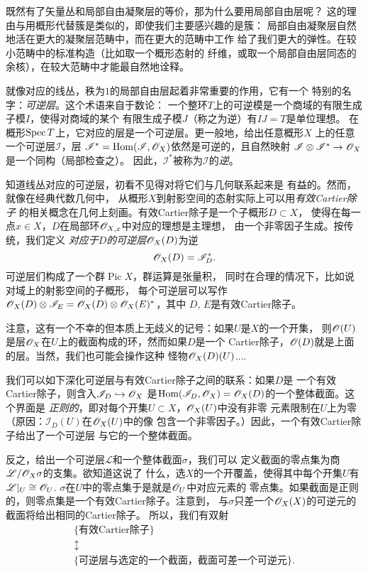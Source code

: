 既然有了矢量丛和局部自由凝聚层的等价，那为什么要用局部自由层呢？
这的理由与用概形代替簇是类似的，即使我们主要感兴趣的是簇：
局部自由凝聚层自然地活在更大的凝聚层范畴中，而在更大的范畴中工作
给了我们更大的弹性。在较小范畴中的标准构造（比如取一个概形态射的
纤维，或取一个局部自由层同态的余核），在较大范畴中才能最自然地诠释。

就像对应的线丛，秩为$1$的局部自由层起着非常重要的作用，它有一个
特别的名字：\textit{可逆层}。这个术语来自于数论：
一个整环$T$上的可逆模是一个商域的有限生成子模$I$，使得对商域的某个
有限生成子模$J$（称之为逆）有$IJ=T$是单位理想。%
在概形$\operatorname{Spec} T$上，它对应的层是一个可逆层。更一般地，给出任意概形$X$
上的任意一个可逆层$\mathscr I$，层
$\mathscr I^*=\operatorname{Hom}(\mathscr I,\mathscr{O}_X)$依然是可逆的，且自然映射
$\mathscr I\otimes \mathscr I^*\to \mathscr{O}_X$是一个同构（局部检查之）。
因此，$\mathscr I^*$被称为$\mathscr I$的\textit{逆}。

知道线丛对应的可逆层，初看不见得对将它们与几何联系起来是
有益的。然而，就像在经典代数几何中，
从概形$X$到射影空间的态射实际上可以用\textit{有效Cartier除子}
的相关概念在几何上刻画。有效Cartier除子是一个子概形$D\subset X$，
使得在每一点$x\in X$，$D$在局部环$\mathscr{O}_{X,x}$中对应的理想是主理想，
由一个非零因子生成。按传统，我们定义
\textit{对应于$D$的可逆层$\mathscr{O}_X(D)$}为逆
\[
	\mathscr{O}_X(D)=\mathscr I_D^*.
\]
可逆层们构成了一个群$\operatorname{Pic} X$，群运算是张量积，
同时在合理的情况下，比如说对域上的射影空间的子概形，
每个可逆层可以写作
$\mathscr{O}_X(D)\otimes \mathscr I_E=\mathscr{O}_X(D)\otimes \mathscr{O}_X(E)^*$，其中
$D$, $E$是有效Cartier除子。

注意，这有一个不幸的但本质上无歧义的记号：如果$U$是$X$的一个开集，
则$\mathscr{O}(U)$是层$\mathscr{O}_X$在$U$上的截面构成的环，然而如果$D$是一个
Cartier除子，$\mathscr{O}(D)$就是上面的层。当然，我们也可能会操作这种
怪物$\mathscr{O}_X(D)(U)$....

我们可以如下深化可逆层与有效Cartier除子之间的联系：如果$D$是
一个有效Cartier除子，则含入$\mathscr I_D\hookrightarrow \mathscr{O}_X$
是$\operatorname{Hom}(\mathscr I_D,\mathscr{O}_X)=\mathscr{O}_X(D)$的一个整体截面。这个界面是
\textit{正则的}，即对每个开集$U\subset X$，$\mathscr{O}_X(U)$中没有非零
元素限制在$U$上为零（原因：$\mathscr I_D(U)$在$\mathscr{O}_X(U)$中的像
包含一个非零因子。）因此，一个有效Cartier除子给出了一个可逆层
与它的一个整体截面。

反之，给出一个可逆层$\mathscr L$和一个整体截面$\sigma$，我们可以
定义截面的零点集为商$\mathscr L/\mathscr{O}_X\sigma$的支集。欲知道这说了
什么，选$X$的一个开覆盖，使得其中每个开集$U$有$\mathscr L|_{U}
\cong \mathscr{O}_U$. $\sigma$在$U$中的零点集于是就是$\mathscr{O}_U$中对应元素的
零点集。如果截面是正则的，则零点集是一个有效Cartier除子。注意到，
与$\sigma$只差一个$\mathscr{O}_X(X)$的可逆元的截面将给出相同的Cartier除子。
所以，我们有双射
\[
	\begin{array}{c}
	\{\text{有效Cartier除子}\}\\
	\updownarrow \\
	\{\text{可逆层与选定的一个截面，截面可差一个可逆元}\}.
	\end{array}
\]

